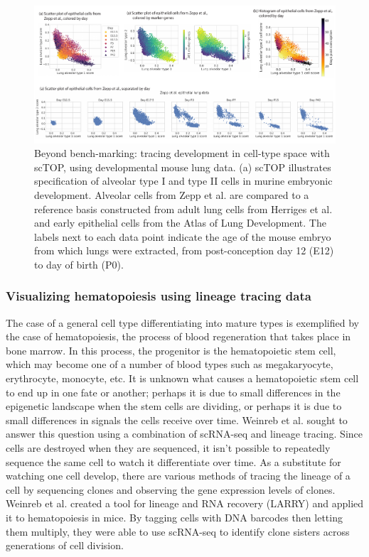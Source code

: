 \documentclass[aps,superscriptaddress, notitlepage,longbibliography]{revtex4-1}
\begin{document}
\begin{figure}
	\centering
		\includegraphics[scale=0.75]{figs/scTOP manuscript fig4.pdf}
	\caption{Beyond bench-marking: tracing development in cell-type space with scTOP, using developmental mouse lung data. (a) scTOP illustrates specification of alveolar type I and type II cells in murine embryonic development. Alveolar cells from Zepp et al. are compared to a reference basis constructed from adult lung cells from Herriges et al. and early epithelial cells from the Atlas of Lung Development. The labels next to each data point indicate the age of the mouse embryo from which lungs were extracted, from post-conception day 12 (E12) to day of birth (P0). }
	\label{FIG:4}
\end{figure}

\subsubsection{Visualizing hematopoiesis using lineage tracing data}

The case of a general cell type differentiating into mature types is exemplified by the case of hematopoiesis, the process of blood regeneration that takes place in bone marrow. In this process, the progenitor is the hematopoietic stem cell, which may become one of a number of blood types such as megakaryocyte, erythrocyte, monocyte, etc. It is unknown what causes a hematopoietic stem cell to end up in one fate or another; perhaps it is due to small differences in the epigenetic landscape when the stem cells are dividing, or perhaps it is due to small differences in signals the cells receive over time. Weinreb et al. \cite{weinreb_lineage_2020} sought to answer this question using a combination of scRNA-seq and lineage tracing. Since cells are destroyed when they are sequenced, it isn't possible to repeatedly sequence the same cell to watch it differentiate over time. As a substitute for watching one cell develop, there are various methods of tracing the lineage of a cell by sequencing clones and observing the gene expression levels of clones. Weinreb et al. created a tool for lineage and RNA recovery (LARRY) and applied it to hematopoiesis in mice. By tagging cells with DNA barcodes then letting them multiply, they were able to use scRNA-seq to identify clone sisters across generations of cell division.
\end{document}
